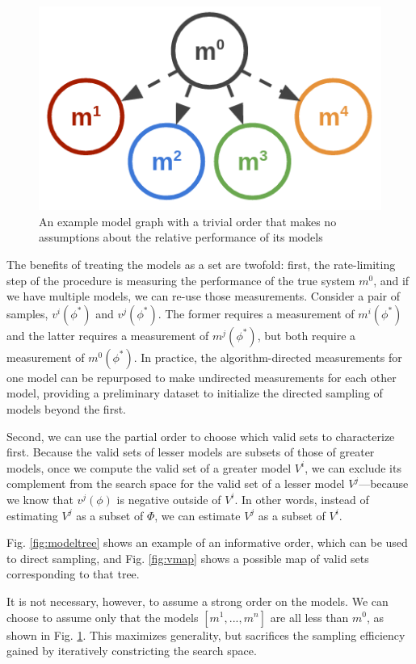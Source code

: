 \documentclass{amsart}
\begin{document}
\begin{figure}[htbp]
    \centerline{\includegraphics[width=0.9\columnwidth]{img/model_tree_unordered.png}}
    \caption{An example model graph with a trivial order that makes no assumptions about the relative performance of its models
    }
    \label{fig:modeltree2}
\end{figure}

The benefits of treating the models as a set are twofold: first, the rate-limiting step of the procedure is measuring the performance of the true system $m^0$, and if we have multiple models, we can re-use those measurements. Consider a pair of samples, $v^i(\phi^*)$ and $v^j(\phi^*)$. The former requires a measurement of $m^i(\phi^*)$ and the latter requires a measurement of $m^j(\phi^*)$, but both require a measurement of $m^0(\phi^*)$. In practice, the algorithm-directed measurements for one model can be repurposed to make undirected measurements for each other model, providing a preliminary dataset to initialize the directed sampling of models beyond the first.

Second, we can use the partial order to choose which valid sets to characterize first. Because the valid sets of lesser models are subsets of those of greater models, once we compute the valid set of a greater model $V^i$, we can exclude its complement from the search space for the valid set of a lesser model $V^j$---because we know that $v^j(\phi)$ is negative outside of $V^i$. In other words, instead of estimating $V^j$ as a subset of $\Phi$, we can estimate $V^j$ as a subset of $V^i$.

Fig. \ref{fig:modeltree} shows an example of an informative order, which can be used to direct sampling, and Fig. \ref{fig:vmap} shows a possible map of valid sets corresponding to that tree.

It is not necessary, however, to assume a strong order on the models. We can choose to assume only that the models $[m^1,...,m^n]$ are all less than $m^0$, as shown in Fig. \ref{fig:modeltree2}. This maximizes generality, but sacrifices the sampling efficiency gained by iteratively constricting the search space.
\end{document}
